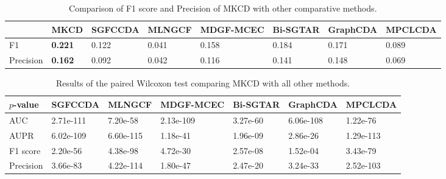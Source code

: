 \documentclass[journal,twoside,web]{ieeecolor}
\begin{document}
\begin{table}[!t]
    \centering
    \renewcommand{\arraystretch}{1.2}
    \begin{threeparttable}[b]
        \caption{Comparison of F1 score and Precision of MKCD with other comparative methods. }\label{tab:tabF1}
        \label{tab:F1}
        \begin{tabular}{p{1.3cm}<{\centering} p{1.9cm}<{\centering}  p{1.9cm}<{\centering} p{1.9cm}<{\centering} p{2.0cm}<{\centering} p{1.9cm}<{\centering} p{1.9cm}<{\centering} p{1.9cm}<{\centering}}
            \hline
            \textbf{} & \textbf{MKCD} & \textbf{SGFCCDA} & \textbf{MLNGCF} & \textbf{MDGF-MCEC} &  \textbf{Bi-SGTAR} & \textbf{GraphCDA} & \textbf{MPCLCDA}\\
            \hline
            F1 & \textbf{0.221} & 0.122 & 0.041 &  0.158 & 0.184 & 0.171 & 0.089\\
            Precision & \textbf{0.162} & 0.092 & 0.042 &  0.116 & 0.141 & 0.148 & 0.069 \\
            \hline
        \end{tabular}
    \end{threeparttable}
    \vspace{-0.4cm}
\end{table}

\begin{table}[!t]
    \centering
    \renewcommand{\arraystretch}{1.2}
    \begin{threeparttable}[b]
        \caption{Results of the paired Wilcoxon test comparing MKCD with all other methods. }\label{tab:tab2}
        \label{tab:02}
        \begin{tabular}{p{1.9cm}<{\centering}  p{2.2cm}<{\centering} p{2.2cm}<{\centering} p{2.2cm}<{\centering} p{2.2cm}<{\centering} p{2.2cm}<{\centering} p{2.2cm}<{\centering}}
            \hline
            \textbf{$p$-value} & \textbf{SGFCCDA} & \textbf{MLNGCF} & \textbf{MDGF-MCEC} &  \textbf{Bi-SGTAR} & \textbf{GraphCDA} & \textbf{MPCLCDA}\\
            \hline
            AUC & 2.71e-111 & 7.20e-58 & 2.13e-109 &  3.27e-60 & 6.06e-108 & 1.22e-76 \\
            AUPR & 6.02e-109 & 6.60e-115 & 1.18e-41 &  1.96e-09 & 2.86e-26 & 1.29e-113 \\
            F1 score & 2.20e-56 & 4.38e-98 & 4.72e-30 & 2.57e-08 & 1.52e-04 & 3.43e-79\\
            Precision & 3.66e-83 & 4.22e-114 & 1.80e-47 & 2.47e-20 & 3.24e-33 & 2.52e-103\\
            \hline
        \end{tabular}
    \end{threeparttable}
    \vspace{-0.4cm}
\end{table}
\end{document}
